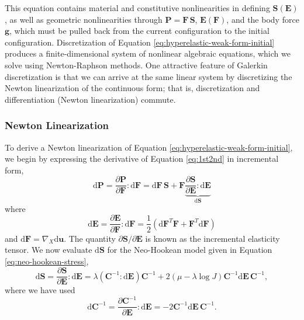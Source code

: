 This equation contains material and constitutive nonlinearities in defining $\mathbf S \left( \mathbf E \right)$, as well as geometric nonlinearities through $\mathbf P = \mathbf F\, \mathbf S$, $\mathbf E \left( \mathbf F \right)$, and the body force $\mathbf g$, which must be pulled back from the current configuration to the initial configuration.
Discretization of Equation \ref{eq:hyperelastic-weak-form-initial} produces a finite-dimensional system of nonlinear algebraic equations, which we solve using Newton-Raphson methods.
One attractive feature of Galerkin discretization is that we can arrive at the same linear system by discretizing the Newton linearization of the continuous form; that is, discretization and differentiation (Newton linearization) commute.

\subsubsection{Newton Linearization}

To derive a Newton linearization of Equation \ref{eq:hyperelastic-weak-form-initial}, we begin by expressing the derivative of Equation \ref{eq:1st2nd} in incremental form,
\begin{equation}
   \text{d} \mathbf P = \frac{\partial \mathbf P}{\partial \mathbf F} \!:\! \text{d} \mathbf F = \text{d} \mathbf F\, \mathbf S + \mathbf F \underbrace{\frac{\partial \mathbf S}{\partial \mathbf E} \!:\! \text{d} \mathbf E}_{\text{d} \mathbf S}
   \label{eq:diff-P}
\end{equation}
where
\begin{equation}
   \text{d} \mathbf E = \frac{\partial \mathbf E}{\partial \mathbf F} \!:\! \text{d} \mathbf F = \frac 1 2 \left( \text{d} \mathbf F^T \mathbf F + \mathbf F^T \text{d} \mathbf F \right)
\end{equation}
and $\text{d}\mathbf F = \nabla_X\text{d}\mathbf u$.
The quantity ${\partial \mathbf S} / {\partial \mathbf E}$ is known as the incremental elasticity tensor.
We now evaluate $\text{d} \mathbf S$ for the Neo-Hookean model given in Equation \ref{eq:neo-hookean-stress},
\begin{equation}
   \text{d}\mathbf S = \frac{\partial \mathbf S}{\partial \mathbf E} \!:\! \text{d} \mathbf E
   = \lambda \left(\mathbf C^{-1} \!:\! \text{d}\mathbf E \right) \mathbf C^{-1}
     + 2 \left(\mu - \lambda \log J \right) \mathbf C^{-1} \text{d}\mathbf E \, \mathbf C^{-1},
   \label{eq-neo-hookean-incremental-stress}
\end{equation}
where we have used
\begin{equation}
   \text{d} \mathbf C^{-1} = \frac{\partial \mathbf C^{-1}}{\partial \mathbf E} \!:\! \text{d}\mathbf E
   = -2 \mathbf C^{-1} \text{d} \mathbf E \, \mathbf C^{-1} .
\end{equation}

